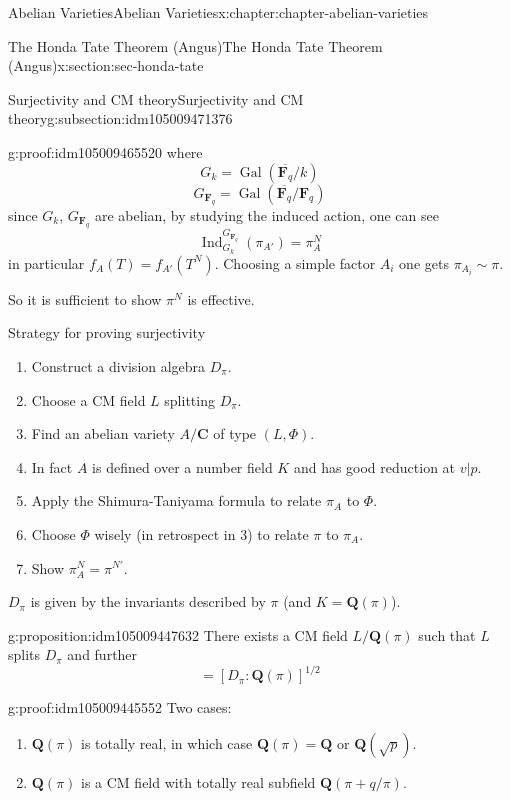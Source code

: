 \documentclass[oneside,10pt,]{book}
\numberwithin{equation}{section}
\newcommand{\QQ}{\mathbf{Q}}
\newcommand{\CC}{\mathbf{C}}
\newcommand{\FF}{\mathbf{F}}
\newcommand{\Gal}[2]{\operatorname{Gal}(#1/#2)}
\DeclareMathOperator{\Ind}{Ind}
\begin{document}
\begin{chapterptx}{Abelian Varieties}{}{Abelian Varieties}{}{}{x:chapter:chapter-abelian-varieties}
\begin{sectionptx}{The Honda Tate Theorem (Angus)}{}{The Honda Tate Theorem (Angus)}{}{}{x:section:sec-honda-tate}
\begin{subsectionptx}{Surjectivity and CM theory}{}{Surjectivity and CM theory}{}{}{g:subsection:idm105009471376}
\begin{proofptx}{}{g:proof:idm105009465520}
where%
\begin{equation*}
G_k = \Gal{\overline{\FF_q}}{k}
\end{equation*}
%
\begin{equation*}
G_{\FF_q} = \Gal{\overline{\FF_q}}{\FF_q}
\end{equation*}
since \(G_k\), \(G_{\FF_q}\) are abelian, by studying the induced action, one can see%
\begin{equation*}
\Ind_{G_k}^{G_{\FF_q}} (\pi_{A'}) = \pi_A^N
\end{equation*}
in particular \(f_A(T) = f_{A'}(T^N)\). Choosing a simple factor \(A_i\) one gets \(\pi_{A_i} \sim \pi\).%
\end{proofptx}
So it is sufficient to show \(\pi^N\) is effective.%
\par
Strategy for proving surjectivity%
\begin{enumerate}
\item{}Construct a division algebra \(D_\pi\).%
\item{}Choose a CM field \(L\) splitting \(D_\pi\).%
\item{}Find an abelian variety \(A/\CC\) of type \((L, \Phi)\).%
\item{}In fact \(A\) is defined over  a number field \(K\) and has good reduction at \(v|p\).%
\item{}Apply the Shimura-Taniyama formula to relate \(\pi_A\) to \(\Phi\).%
\item{}Choose \(\Phi\) wisely (in retrospect in 3) to relate \(\pi\) to \(\pi_A\).%
\item{}Show \(\pi_A^N = \pi^{N'}\).%
\end{enumerate}
%
\par
\(D_\pi\) is given by the invariants described by \(\pi\) (and \(K = \QQ(\pi)\)).%
\begin{proposition}{}{}{g:proposition:idm105009447632}%
There exists a CM field \(L/\QQ(\pi)\) such that \(L\) splits \(D_\pi\) and further%
\begin{equation*}
[L:\QQ(\pi) ] = [ D_\pi: \QQ(\pi)]^{1/2}
\end{equation*}
%
\end{proposition}
\begin{proofptx}{}{g:proof:idm105009445552}
Two cases:%
\begin{enumerate}
\item{}\(\QQ(\pi)\) is totally real, in which case \(\QQ(\pi) = \QQ\) or \(\QQ(\sqrt{p})\).%
\item{}\(\QQ(\pi)\) is a CM field with totally real subfield \(\QQ(\pi + q/\pi)\).%

\end{enumerate}
\end{proofptx}
\end{subsectionptx}
\end{sectionptx}
\end{chapterptx}
\end{document}
